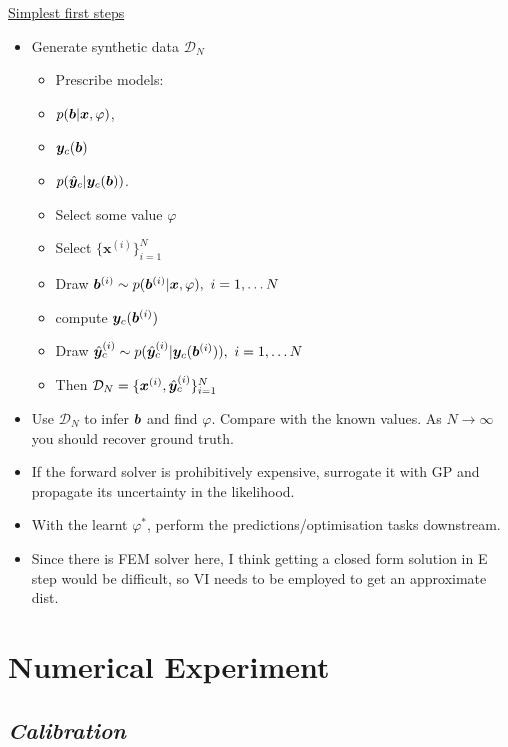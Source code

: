 \documentclass[a4paper,11pt]{article}
\begin{document}
\underline{Simplest first steps}
\begin{itemize}
    \item Generate synthetic data $\mathcal{D}_N$
    \begin{itemize}
        \item Prescribe models:
        \bi
        \item $p(\boldsymbol{b} | \boldsymbol{x}, \varphi)$,
        \item $\boldsymbol{y}_c(\boldsymbol{b})$ 
        \item $p(\hat{\boldsymbol{y}}_c | \boldsymbol{y}_c(\boldsymbol{b}))$.
        \ei
      \item Select some value  $\varphi$ 
      \item Select $\{\bm{x}^{(i)}\}_{i=1}^N$
        \item Draw  $\bm{b}^{(i)} \sim  p(\boldsymbol{b}^{(i)} | \boldsymbol{x}, \varphi),~i=1,\ldots N$
        \item compute $\boldsymbol{y}_c(\boldsymbol{b}^{(i)})$ 
        \item Draw $\hat{\boldsymbol{y}}_c^{(i)} \sim   p(\hat{\boldsymbol{y}}_c^{(i)} | \boldsymbol{y}_c(\boldsymbol{b}^{(i)})),~i=1,\ldots N$
      \item Then $\mathcal{D}_N=\{ \bm{x}^{(i)}, \hat{\boldsymbol{y}}_c^{(i)} \}_{i=1}^N$
    \end{itemize}
    \item Use $\mathcal{D}_N$ to infer $\boldsymbol{b}$ and find $\varphi$. Compare with the known values. As $N\to \infty$ you should recover ground truth.
    \item If the forward solver is prohibitively expensive, surrogate it with GP and propagate its uncertainty in the likelihood.
    \item With the learnt $\varphi^*$, perform the predictions/optimisation tasks downstream.
    \item Since there is FEM solver here, I think getting a closed form solution in E step would be difficult, so VI needs to be employed to get an approximate dist.
\end{itemize}

\section{Numerical Experiment}

\subsection{\emph{Calibration}}\label{calibration_section}
\end{document}
